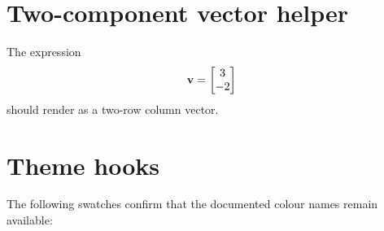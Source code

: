 \documentclass{studentnotes}
\begin{document}
\section{Two-component vector helper}

The expression
\[
    \mathbf{v}=\begin{bmatrix} 3 \\ -2 \end{bmatrix}
\]
should render as a two-row column vector.

\section{Theme hooks}

The following swatches confirm that the documented colour names remain
available:

\begin{center}
    \quad
    \quad
    \\[1em]
    \quad
\end{center}
\end{document}

